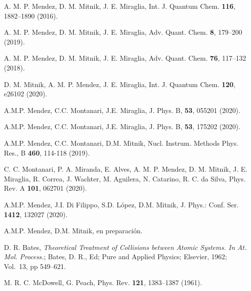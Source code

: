 
\begin{thebibliography}{9}

A. M. P. Mendez, D. M. Mitnik, J. E. Miraglia, 
Int. J. Quantum Chem. \textbf{116}, 1882--1890 (2016).

A. M. P. Mendez, D. M. Mitnik, J. E. Miraglia, 
Adv. Quant. Chem. \textbf{8}, 179--200 (2019).

A. M. P. Mendez, D. M. Mitnik, J. E. Miraglia, 
Adv. Quant. Chem. \textbf{76}, 117--132 (2018).

D. M. Mitnik, A. M. P. Mendez, J. E. Miraglia, 
Int. J. Quantum Chem. \textbf{120}, e26102 (2020).

A.M.P. Mendez, C.C. Montanari, J.E. Miraglia,
J. Phys. B, \textbf{53}, 055201 (2020).

A.M.P. Mendez, C.C. Montanari, J.E. Miraglia,
J. Phys. B, \textbf{53}, 175202 (2020). 

A.M.P. Mendez, C.C. Montanari, D.M. Mitnik, 
Nucl. Instrum. Methods Phys. Res., B \textbf{460}, 114-118 (2019).

C. C. Montanari, P. A. Miranda, E. Alves, A. M. P. Mendez,
D. M. Mitnik, J. E. Miraglia, R. Correa, J. Wachter, M. Aguilera, 
N. Catarino, R. C. da Silva,
Phys. Rev. A \textbf{101}, 062701 (2020). 


A.M.P. Mendez, J.I. Di Filippo, S.D. López, D.M. Mitnik,
J. Phys.: Conf. Ser. \textbf{1412}, 132027 (2020).

A.M.P. Mendez, D.M. Mitnik, en preparación.



D. R. Bates, 
\textit{Theoretical Treatment of Collisions between Atomic Systems.
In At. Mol. Process.};
Bates, D. R., Ed;
Pure and Applied Physics;
Elsevier, 1962;
Vol.~13, pp 549--621.

M. R. C. McDowell, G. Peach, 
Phys. Rev. \textbf{121}, 1383--1387 (1961).


\end{thebibliography}
